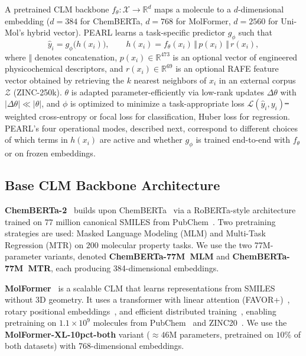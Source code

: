 \documentclass[pdflatex,sn-mathphys-num,Numbered]{sn-jnl}%
\makeatletter
\providecommand{\DIFadd}[1]{{\protect\color{blue}\uwave{#1}}} %
\providecommand{\DIFdel}[1]{{\protect\color{red}\sout{#1}}} %
\providecommand{\DIFaddbegin}{} %
\providecommand{\DIFaddend}{} %
\providecommand{\DIFdelbegin}{} %
\providecommand{\DIFdelend}{} %
\providecommand{\DIFscaledelfig}{0.5}
\newlength{\DIFdelgraphicswidth} %
\newlength{\DIFdelgraphicsheight} %
\providecommand{\DIFaddincludegraphics}[2][]{{\color{blue}\fbox{\DIFOincludegraphics[#1]{#2}}}} %
\providecommand{\DIFdelincludegraphics}[2][]{%
\sbox{\DIFdelgraphicsbox}{\DIFOincludegraphics[#1]{#2}}%
\settoboxwidth{\DIFdelgraphicswidth}{\DIFdelgraphicsbox} %
\settoboxtotalheight{\DIFdelgraphicsheight}{\DIFdelgraphicsbox} %
\scalebox{\DIFscaledelfig}{%
\parbox[b]{\DIFdelgraphicswidth}{\usebox{\DIFdelgraphicsbox}\\[-\baselineskip] \rule{\DIFdelgraphicswidth}{0em}}\llap{\resizebox{\DIFdelgraphicswidth}{\DIFdelgraphicsheight}{%
\setlength{\unitlength}{\DIFdelgraphicswidth}%
\begin{picture}(1,1)%
\thicklines\linethickness{2pt} %
{\color[rgb]{1,0,0}\put(0,0){\framebox(1,1){}}}%
{\color[rgb]{1,0,0}\put(0,0){\line( 1,1){1}}}%
{\color[rgb]{1,0,0}\put(0,1){\line(1,-1){1}}}%
\end{picture}%
}\hspace*{3pt}}} %
} %
\DeclareRobustCommand{\DIFaddbegin}{\DIFOaddbegin \let\includegraphics\DIFaddincludegraphics} %
\DeclareRobustCommand{\DIFaddend}{\DIFOaddend \let\includegraphics\DIFOincludegraphics} %
\DeclareRobustCommand{\DIFdelbegin}{\DIFOdelbegin \let\includegraphics\DIFdelincludegraphics} %
\DeclareRobustCommand{\DIFdelend}{\DIFOaddend \let\includegraphics\DIFOincludegraphics} %
\let\sout@orig\sout %
\renewcommand{\sout}[1]{\ifmmode\text{\sout@orig{\ensuremath{#1}}}\else\sout@orig{#1}\fi} %
\makeatother
\begin{document}
A pretrained CLM backbone $f_\theta : \mathcal{X} \rightarrow \mathbb{R}^{d}$ maps a molecule to a $d$-dimensional embedding ($d=384$ for ChemBERTa, $d=768$ for MolFormer, $d=2560$ for Uni-Mol's hybrid vector). PEARL learns a task-specific predictor $g_\phi$ such that
\begin{equation}
  \hat{y}_i = g_\phi\big(h(x_i)\big), \qquad h(x_i) = f_\theta(x_i) \,\Vert\, p(x_i) \,\Vert\, r(x_i),
\end{equation}
where $\Vert$ denotes concatenation, $p(x_i) \in \mathbb{R}^{473}$ is an optional vector of engineered physicochemical descriptors, and \DIFdelbegin \DIFdel{$r(x_i) \in \mathbb{R}^{69}$ }\DIFdelend \DIFaddbegin \DIFadd{$r(x_i) \in \mathbb{R}^{60}$ }\DIFaddend is an optional RAFE feature vector obtained by retrieving the $k$ nearest neighbors of $x_i$ in an external corpus $\mathcal{Z}$ (ZINC-250k). $\theta$ is adapted parameter-efficiently via low-rank updates $\Delta\theta$ with $|\Delta\theta| \ll |\theta|$, and $\phi$ is optimized to minimize a task-appropriate loss $\mathcal{L}(\hat y_i, y_i)$\DIFdelbegin \DIFdel{-- }\DIFdelend \DIFaddbegin \DIFadd{: }\DIFaddend weighted cross-entropy or focal loss for classification, Huber loss for regression. PEARL's four operational modes, described next, correspond to different choices of which terms in $h(x_i)$ are active and whether $g_\phi$ is trained end-to-end with $f_\theta$ or on frozen embeddings.

\subsection{Base CLM Backbone Architecture}\label{sec:pretrained_clms}
\textbf{ChemBERTa-2}~\cite{ahmad2022chemberta2} builds upon ChemBERTa~\cite{chithrananda2020chemberta} via a RoBERTa-style architecture trained on $77$ million canonical SMILES from PubChem~\cite{kim2023pubchem}. Two pretraining strategies are used: Masked Language Modeling (MLM) and Multi-Task Regression (MTR) on $200$ molecular property tasks. We use the two 77M-parameter variants, denoted \textbf{ChemBERTa-77M~MLM} and \textbf{ChemBERTa-77M~MTR}, each producing 384-dimensional embeddings.

\textbf{MolFormer}~\cite{ross2022molformer} is a scalable CLM that learns representations from SMILES without 3D geometry. It uses a transformer with linear attention (FAVOR+)~\cite{choromanski2021rethinking}, rotary positional embeddings~\cite{heo2024rotary}, and efficient distributed training~\cite{isard2009distributed}, enabling pretraining on $1.1\times 10^{9}$ molecules from PubChem~\cite{kim2023pubchem} and ZINC20~\cite{irwin2020zinc20}. We use the \textbf{MolFormer-XL-10pct-both} variant ($\approx 46$M parameters, pretrained on $10\%$ of both datasets) with 768-dimensional embeddings.
\end{document}
